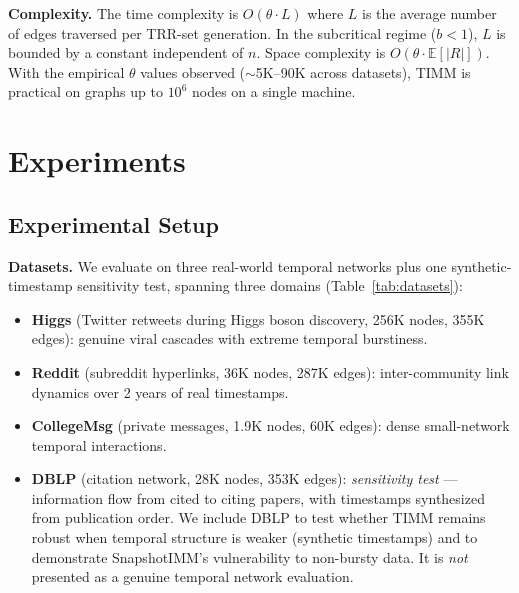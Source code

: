 \documentclass[10pt,conference]{IEEEtran}
\newcommand{\tiimm}{TIMM\xspace}
\begin{document}
\textbf{Complexity.}
The time complexity is $O(\theta \cdot L)$ where $L$ is the average number of edges traversed per TRR-set generation.
In the subcritical regime ($b < 1$), $L$ is bounded by a constant independent of $n$.
Space complexity is $O(\theta \cdot \mathbb{E}[|R|])$.
With the empirical $\theta$ values observed ($\sim$5K--90K across datasets), \tiimm{} is practical on graphs up to $10^6$ nodes on a single machine.

\section{Experiments}

\subsection{Experimental Setup}

\textbf{Datasets.}
We evaluate on three real-world temporal networks plus one synthetic-timestamp sensitivity test, spanning three domains (Table~\ref{tab:datasets}):
\begin{itemize}
\item \textbf{Higgs} (Twitter retweets during Higgs boson discovery, 256K nodes, 355K edges): genuine viral cascades with extreme temporal burstiness.
\item \textbf{Reddit} (subreddit hyperlinks, 36K nodes, 287K edges): inter-community link dynamics over 2 years of real timestamps.
\item \textbf{CollegeMsg} (private messages, 1.9K nodes, 60K edges): dense small-network temporal interactions.
\item \textbf{DBLP} (citation network, 28K nodes, 353K edges): \emph{sensitivity test} — information flow from cited to citing papers, with timestamps synthesized from publication order. We include DBLP to test whether TIMM remains robust when temporal structure is weaker (synthetic timestamps) and to demonstrate SnapshotIMM's vulnerability to non-bursty data. It is \emph{not} presented as a genuine temporal network evaluation.
\end{itemize}
\end{document}
